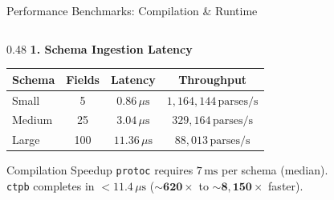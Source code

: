 \documentclass[aspectratio=169,10pt]{beamer}
\begin{document}
\begin{frame}{Performance Benchmarks: Compilation \& Runtime}
  \begin{columns}[T]
    \begin{column}{0.48\textwidth}
      \textbf{1. Schema Ingestion Latency}
      \begin{table}
        \scriptsize
        \begin{tabular}{lccc}
          \toprule
          \textbf{Schema} & \textbf{Fields} & \textbf{Latency} & \textbf{Throughput} \\
          \midrule
          Small & 5 & $0.86\,\mu\text{s}$ & $1{,}164{,}144\,\text{parses/s}$ \\
          Medium & 25 & $3.04\,\mu\text{s}$ & $329{,}164\,\text{parses/s}$ \\
          Large & 100 & $11.36\,\mu\text{s}$ & $88{,}013\,\text{parses/s}$ \\
          \bottomrule
        \end{tabular}
      \end{table}
      \vspace{0.3em}
      \begin{alertblock}{Compilation Speedup}
        \texttt{protoc} requires $7\,\text{ms}$ per schema (median).\\
        \texttt{ctpb} completes in $< 11.4\,\mu\text{s}$ ($\mathbf{\sim 620\times}$ to $\mathbf{\sim 8{,}150\times}$ faster).
      \end{alertblock}
    \end{column}


\end{columns}
\end{frame}
\end{document}
